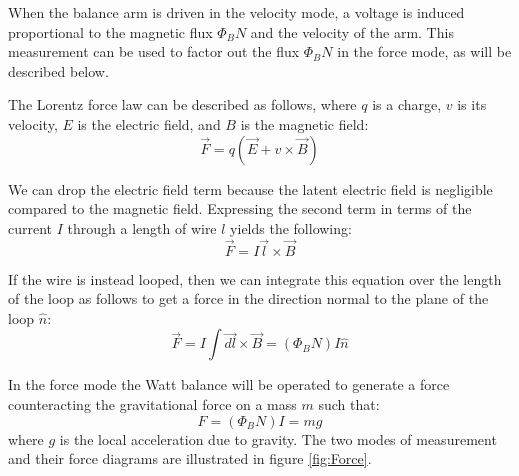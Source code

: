 \documentclass[aps,prstab,reprint,12pt]{revtex4-1}
\begin{document}
When the balance arm is driven in the velocity mode, a voltage is induced proportional to the magnetic flux $\Phi_B N$ and the velocity of the arm. This measurement can be used to factor out the flux $\Phi_B N$ in the force mode, as will be described below.



The Lorentz force law can be described as follows, where $q$ is a charge, $v$ is its velocity, $E$ is the electric field, and $B$ is the magnetic field:
\begin{equation}
    \vec{F} = q(\vec{E}+v\times \vec{B})
\end{equation}

We can drop the electric field term because the latent electric field is negligible compared to the magnetic field. Expressing the second term in terms of the current $I$ through a length of wire $l$ yields the following:
\begin{equation}
    \vec{F} = I \vec{l}\times \vec{B}
\end{equation}

If the wire is instead looped, then we can integrate this equation over the length of the loop as follows to get a force in the direction normal to the plane of the loop $\hat{n}$:
\begin{equation}
    \vec{F} = I\int\vec{dl}\times\vec{B}  = (\Phi_B N)I \hat{n}
\end{equation}





In the force mode the Watt balance will be operated to generate a force counteracting the gravitational force on a mass $m$ such that:
\begin{equation}\label{eq:force_equation}
    F=(\Phi_B N)I=mg
\end{equation}
where $g$ is the local acceleration due to gravity. The two modes of measurement and their force diagrams are illustrated in figure \ref{fig:Force}. 
\end{document}
